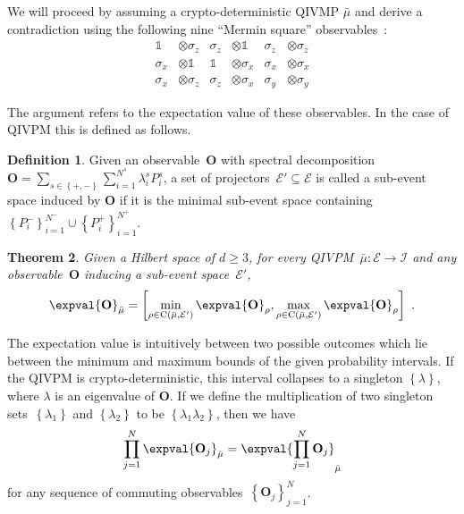 \documentclass[english,reprint, aps, prl,superscriptaddress, showpacs,
showkeys, longbibliography, amsmath, amssymb]{revtex4-1}
\theoremstyle{plain}
\newtheorem{thm}{Theorem}
\theoremstyle{definition}
\newtheorem{definition}[thm]{Definition}
\newcommand{\events}{\ensuremath{\mathcal{E}}}
\newcommand{\coreBorn}{\ensuremath{\mathrm{C}}}
\begin{document}
We will proceed by assuming a crypto-deterministic QIVMP $\bar{\mu}$
and derive a contradiction using the following nine ``Mermin square''
observables~\cite{Mermin1990Simple,peres1995quantum}:
\begin{equation}
\begin{aligned}\mathbb{1} & \otimes\sigma_{z} & \sigma_{z} & \otimes\mathbb{1} & \sigma_{z} & \otimes\sigma_{z}\\
\sigma_{x} & \otimes\mathbb{1} & \mathbb{1} & \otimes\sigma_{x} & \sigma_{x} & \otimes\sigma_{x}\\
\sigma_{x} & \otimes\sigma_{z} & \sigma_{z} & \otimes\sigma_{x} & \sigma_{y} & \otimes\sigma_{y}
\end{aligned}
\label{eq:MerminSquare}
\end{equation}

The argument refers to the expectation value of these
observables. In the case of QIVPM this is defined as follows. 

\begin{definition} Given an observable~$\mathbf{O}$ with spectral
  decomposition
  $\mathbf{O}=\sum_{s\in\left\{ +,-\right\}
  }\sum_{i=1}^{N^{s}}\lambda_{i}^{s}P_{i}^{s}$, a set of
  projectors~$\events'\subseteq\events$ is called a sub-event space
  induced by $\mathbf{O}$ if it is the minimal sub-event space
  containing
  $\left\{ P_{i}^{-}\right\} _{i=1}^{N^{-}}\cup\left\{
    P_{i}^{+}\right\} _{i=1}^{N^{+}}$.
\end{definition}

\begin{thm} Given a Hilbert space of $d\ge3$, for every
  QIVPM~$\bar{\mu}:\events\rightarrow\mathscr{I}$ and any
  observable~$\mathbf{O}$ inducing a sub-event space~$\events'$, 
\begin{equation}
\expval{\mathbf{O}}_{\bar{\mu}}=\left[\min_{\rho\in\coreBorn\left(\bar{\mu},\events'\right)}\expval{\mathbf{O}}_{\rho},\max_{\rho\in\coreBorn\left(\bar{\mu},\events'\right)}\expval{\mathbf{O}}_{\rho}\right]\textrm{ .}\label{eq:quantum-interval-expectation-core}
\end{equation}
\end{thm}

The expectation value is intuitively between two possible outcomes
which lie between the minimum and maximum bounds of the given
probability intervals. If the QIVPM is crypto-deterministic, this
interval collapses to a singleton $\left\{ \lambda\right\} $, where
$\lambda$ is an eigenvalue of $\mathbf{O}$. If we define the
multiplication of two singleton sets~$\left\{ \lambda_{1}\right\} $
and $\left\{ \lambda_{2}\right\} $ to be
$\left\{ \lambda_{1}\lambda_{2}\right\} $, then we have
\begin{equation}
\prod_{j=1}^{N}\expval{\mathbf{O}_{j}}_{\bar{\mu}}=\expval{\prod_{j=1}^{N}\mathbf{O}_{j}}_{\bar{\mu}}\label{eq:Kochen-Specker-Rules}
\end{equation}
for any sequence of commuting observables~$\left\{ \mathbf{O}_{j}\right\} _{j=1}^{N}$.
\end{document}
